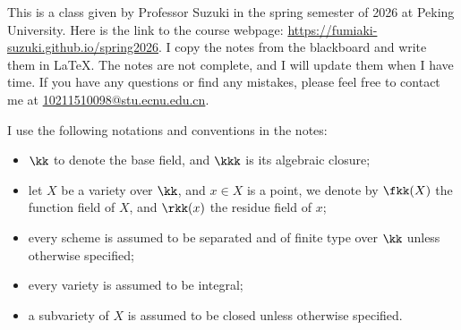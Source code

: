 \vspace{2em}
This is a class given by Professor Suzuki in the spring semester of 2026 at Peking University. 
Here is the link to the course webpage: \url{https://fumiaki-suzuki.github.io/spring2026}.
I copy the notes from the blackboard and write them in \LaTeX.
The notes are not complete, and I will update them when I have time.
If you have any questions or find any mistakes, please feel free to contact me at \href{mailto:10211510098@stu.ecnu.edu.cn}{10211510098@stu.ecnu.edu.cn}.

I use the following notations and conventions in the notes:
\begin{itemize}
    \item \(\kk\) to denote the base field, and \(\kkk\) is its algebraic closure;
    \item let \(X\) be a variety over \(\kk\), and \(x \in X\) is a point, we denote by \(\fkk(X)\) the function field of \(X\), and \(\rkk(x)\) the residue field of \(x\);
    \item every scheme is assumed to be separated and of finite type over \(\kk\) unless otherwise specified;
    \item every variety is assumed to be integral;
    \item a subvariety of \(X\) is assumed to be closed unless otherwise specified.
\end{itemize}